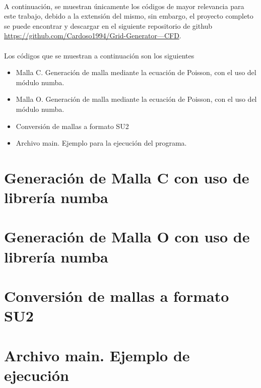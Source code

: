 \documentclass[letterpaper, openright, 12pt]{book}
\begin{document}
\paragraph*{}
    A continuación, se muestran únicamente los códigos de mayor relevancia para
    este trabajo, debido a la extensión del mismo, sin embargo, el proyecto
    completo se puede encontrar y descargar en el siguiente repositorio de
    github \href{https://github.com/Cardoso1994/Grid-Generator---CFD}
    {https://github.com/Cardoso1994/Grid-Generator---CFD}.

\paragraph*{}
    Los códigos que se muestran a continuación son los siguientes
    \begin{itemize}
            \item Malla C. Generación de malla mediante la ecuación de Poisson,
                con el uso del módulo numba.
            \item Malla O. Generación de malla mediante la ecuación de Poisson,
                con el uso del módulo numba.
            \item Conversión de mallas a formato SU2
            \item Archivo main. Ejemplo para la ejecución del programa.
    \end{itemize}

\section{Generación de Malla C con uso de librería numba}


\section{Generación de Malla O con uso de librería numba}


\section{Conversión de mallas a formato SU2}


\section{Archivo main. Ejemplo de ejecución}

%
%
%
%
%
\end{document}
